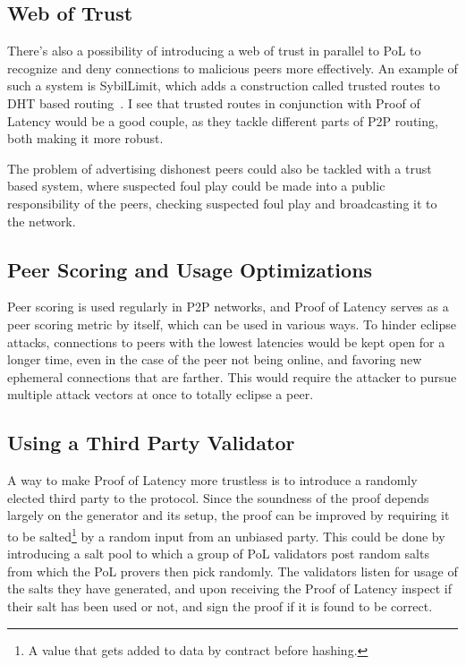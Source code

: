 \subsection{Web of Trust}
There's also a possibility of introducing a web of trust in parallel to PoL to recognize and deny connections to malicious peers more effectively. An example of such a system is SybilLimit, which adds a construction called trusted routes to DHT based routing~\cite{Yu2008-xl}. I see that trusted routes in conjunction with Proof of Latency would be a good couple, as they tackle different parts of P2P routing, both making it more robust.

The problem of advertising dishonest peers could also be tackled with a trust based system, where suspected foul play could be made into a public responsibility of the peers, checking suspected foul play and broadcasting it to the network.

\subsection{Peer Scoring and Usage Optimizations}
Peer scoring is used regularly in P2P networks, and Proof of Latency serves as a peer scoring metric by itself, which can be used in various ways. To hinder eclipse attacks, connections to peers with the lowest latencies would be kept open for a longer time, even in the case of the peer not being online, and favoring new ephemeral connections that are farther. This would require the attacker to pursue multiple attack vectors at once to totally eclipse a peer.

\subsection{Using a Third Party Validator}
A way to make Proof of Latency more trustless is to introduce a randomly elected third party to the protocol. Since the soundness of the proof depends largely on the generator and its setup, the proof can be improved by requiring it to be salted\footnote{A value that gets added to data by contract before hashing.} by a random input from an unbiased party. This could be done by introducing a salt pool to which a group of PoL validators post random salts from which the PoL provers then pick randomly. The validators listen for usage of the salts they have generated, and upon receiving the Proof of Latency inspect if their salt has been used or not, and sign the proof if it is found to be correct.

